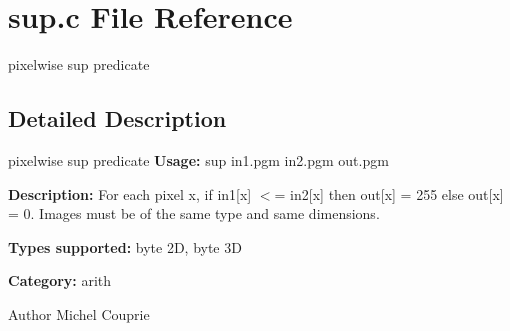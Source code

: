 \section{sup.c File Reference}
\label{sup_8c}


pixelwise sup predicate  




\subsection{Detailed Description}
pixelwise sup predicate {\bfseries Usage:} sup in1.pgm in2.pgm out.pgm

{\bfseries Description:} For each pixel x, if in1[x] $<$= in2[x] then out[x] = 255 else out[x] = 0. Images must be of the same type and same dimensions.

{\bfseries Types supported:} byte 2D, byte 3D

{\bfseries Category:} arith

\begin{DoxyAuthor}{Author}
Michel Couprie 
\end{DoxyAuthor}
